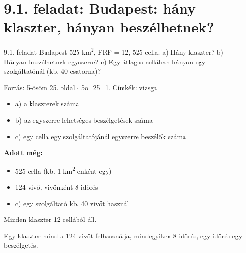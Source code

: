 \section{\texorpdfstring{9.1. feladat: Budapest: hány klaszter, hányan beszélhetnek?}{9.1. feladat: Budapest: hány klaszter, hányan beszélhetnek?}}\label{o9_01}
\setcounter{lepes}{0}
\begin{feladat}{9.1. feladat}
Budapest 525 km\textsuperscript{2}, FRF = 12, 525 cella. a) Hány klaszter? b) Hányan beszélhetnek egyszerre? c) Egy átlagos cellában hányan egy szolgáltatónál (kb. 40 csatorna)?

{\footnotesize\sffamily Forrás: 5-ösöm 25. oldal $\cdot$ 5o\_25\_1. Címkék: vizsga}
\end{feladat}
\begin{keresunk}
\begin{itemize}
\item a) a klaszterek száma
\item b) az egyszerre lehetséges beszélgetések száma
\item c) egy cella egy szolgáltatójánál egyszerre beszélők száma
\end{itemize}
\end{keresunk}
\begin{jeloles}
\par\smallskip\textbf{Adott még:}
\begin{itemize}
\item 525 cella (kb. 1 km\textsuperscript{2}-enként egy)
\item 124 vivő, vivőnként 8 időrés
\item c) egy szolgáltató kb. 40 vivőt használ
\end{itemize}
\end{jeloles}

Minden klaszter 12 cellából áll.

\begin{center}\end{center}

Egy klaszter mind a 124 vivőt felhasználja, mindegyiken 8 időrés, egy időrés egy beszélgetés.

\begin{center}\end{center}

